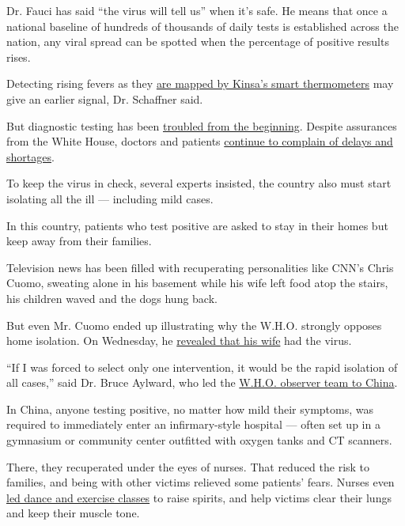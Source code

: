 Dr. Fauci has said ``the virus will tell us'' when it's safe. He means
that once a national baseline of hundreds of thousands of daily tests is
established across the nation, any viral spread can be spotted when the
percentage of positive results rises.

Detecting rising fevers as they
\href{https://www.nytimes3xbfgragh.onion/2020/03/18/health/coronavirus-fever-thermometers.html}{are
mapped by Kinsa's smart thermometers} may give an earlier signal, Dr.
Schaffner said.

But diagnostic testing has been
\href{https://www.nytimes3xbfgragh.onion/2020/03/10/us/coronavirus-testing-delays.html}{troubled
from the beginning}. Despite assurances from the White House, doctors
and patients
\href{https://www.nytimes3xbfgragh.onion/2020/04/06/health/coronavirus-testing-us.html}{continue
to complain of delays and shortages}.

To keep the virus in check, several experts insisted, the country also
must start isolating all the ill --- including mild cases.

In this country, patients who test positive are asked to stay in their
homes but keep away from their families.

Television news has been filled with recuperating personalities like
CNN's Chris Cuomo, sweating alone in his basement while his wife left
food atop the stairs, his children waved and the dogs hung back.

But even Mr. Cuomo ended up illustrating why the W.H.O. strongly opposes
home isolation. On Wednesday, he
\href{https://www.cnn.com/2020/04/15/us/chris-cuomo-wife-coronavirus/index.html}{revealed
that his wife} had the virus.

``If I was forced to select only one intervention, it would be the rapid
isolation of all cases,'' said Dr. Bruce Aylward, who led the
\href{https://www.who.int/docs/default-source/coronaviruse/who-china-joint-mission-on-covid-19-final-report.pdf}{W.H.O.
observer team to China}.

In China, anyone testing positive, no matter how mild their symptoms,
was required to immediately enter an infirmary-style hospital --- often
set up in a gymnasium or community center outfitted with oxygen tanks
and CT scanners.

There, they recuperated under the eyes of nurses. That reduced the risk
to families, and being with other victims relieved some patients' fears.
Nurses even \href{https://www.youtube.com/watch?v=M7fqUHdoOyc}{led dance
and exercise classes} to raise spirits, and help victims clear their
lungs and keep their muscle tone.

